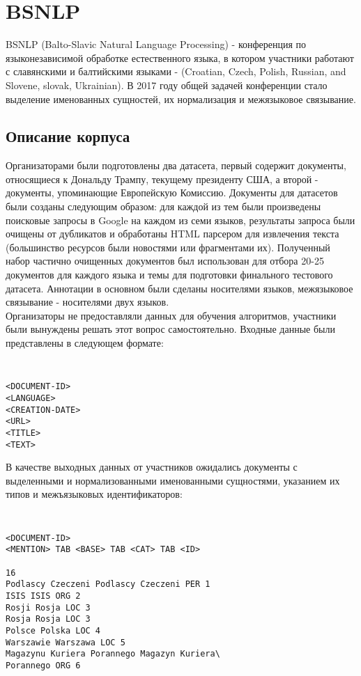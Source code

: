 \section{BSNLP}

BSNLP (Balto-Slavic Natural Language Processing) - конференция по языконезависимой обработке естественного языка, в котором участники работают с славянскими и балтийскими языками - (Croatian, Czech, Polish, Russian, and Slovene, slovak, Ukrainian). В 2017 году общей задачей конференции стало выделение именованных сущностей, их нормализация и межязыковое связывание.

\subsection{Описание корпуса}

Организаторами были подготовлены два датасета, первый содержит документы, относящиеся к Дональду Трампу, текущему президенту США, а второй - документы, упоминающие Европейскую Комиссию. Документы для датасетов были созданы следующим образом: для каждой из тем были произведены поисковые запросы в Google на каждом из семи языков, результаты запроса были очищены от дубликатов и обработаны HTML парсером для извлечения текста (большинство ресурсов были новостями или фрагментами их). Полученный набор частично очищенных документов был использован для отбора 20-25 документов для каждого языка и темы для подготовки финального тестового датасета. Аннотации в основном были сделаны носителями языков, межязыковое связывание - носителями двух языков. \\


Организаторы не предоставляли данных для обучения алгоритмов, участники были вынуждены решать этот вопрос самостоятельно. Входные данные были представлены в следующем формате:

{\tt \small
\begin{verbatim}
<DOCUMENT-ID>
<LANGUAGE>
<CREATION-DATE>
<URL>
<TITLE>
<TEXT>
\end{verbatim}
}
В качестве выходных данных от участников ожидались документы с выделенными и нормализованными именованными сущностями, указанием их типов и межъязыковых идентификаторов:
{\tt \small
\begin{verbatim}
<DOCUMENT-ID>
<MENTION> TAB <BASE> TAB <CAT> TAB <ID>

16
Podlascy Czeczeni Podlascy Czeczeni PER 1
ISIS ISIS ORG 2
Rosji Rosja LOC 3
Rosja Rosja LOC 3
Polsce Polska LOC 4
Warszawie Warszawa LOC 5
Magazynu Kuriera Porannego Magazyn Kuriera\
Porannego ORG 6
\end{verbatim}
}

